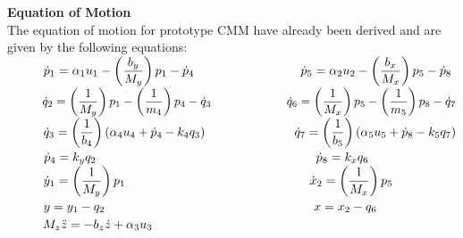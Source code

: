 \documentclass[14pt,a4paper]{article}
\begin{document}
\large\textbf{Equation of Motion}\\
	The equation of motion for prototype CMM have already been derived and are given by the following equations:\\
	\doublespacing
	$ \hspace*{1cm} \dot{p}_1 = \alpha_1u_1 - \left(\dfrac{b_y}{M_y}\right)p_1 - \dot{p}_4   \hspace{3cm}  \dot{p}_5 = \alpha_2u_2 - \left(\dfrac{b_x}{M_x}\right)p_5 - \dot{p}_8 \\$
	$ \hspace*{1cm} \dot{q}_2 = \left(\dfrac{1}{M_y}\right)p_1 - \left(\dfrac{1}{m_4}\right)p_4 - \dot{q}_3   \hspace{2.2cm}  \dot{q}_6 = \left(\dfrac{1}{M_x}\right)p_5 - \left(\dfrac{1}{m_5}\right)p_8 - \dot{q}_7 $\\
	$ \hspace*{1cm} \dot{q}_3 = \left(\dfrac{1}{b_4}\right)\left(\alpha_4u_4 + \dot{p}_4 - k_4q_3\right)    \hspace{2.5cm}  \dot{q}_7 = \left(\dfrac{1}{b_5}\right)\left(\alpha_5u_5 + \dot{p}_8 - k_5q_7\right)$\\
	$ \hspace*{1cm} \dot{p}_4 = k_yq_2    \hspace{6.2cm}  \dot{p}_8 = k_xq_6 $\\
	$ \hspace*{1cm} \dot{y}_1 = \left(\dfrac{1}{M_y}\right)p_1    \hspace{5.2cm} \dot{x}_2 = \left(\dfrac{1}{M_x}\right)p_5 $\\
	$\hspace*{1cm} y = y_1 - q_2   \hspace{5.9cm} x = x_2 - q_6 $\\
	$ \hspace*{1cm} M_z\ddot{z} = -b_z\dot{z} + \alpha_3u_3 \\$

\pagebreak
\end{document}
